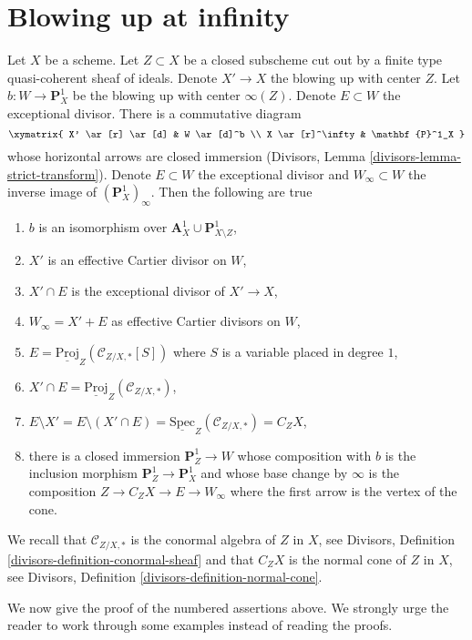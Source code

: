 \section{Blowing up at infinity}
\label{section-blowup-Z-first}

\noindent
Let $X$ be a scheme. Let $Z \subset X$ be a closed subscheme cut out
by a finite type quasi-coherent sheaf of ideals. Denote $X' \to X$
the blowing up with center $Z$. Let $b : W \to \mathbf{P}^1_X$ be the
blowing up with center $\infty(Z)$. Denote $E \subset W$ the exceptional
divisor. There is a commutative diagram
$$
\xymatrix{
X' \ar[r] \ar[d] & W \ar[d]^b \\
X \ar[r]^\infty & \mathbf{P}^1_X
}
$$
whose horizontal arrows are closed immersion
(Divisors, Lemma \ref{divisors-lemma-strict-transform}). Denote $E \subset W$
the exceptional divisor and $W_\infty \subset W$ the inverse image
of $(\mathbf{P}^1_X)_\infty$. Then the following are true
\begin{enumerate}
\item $b$ is an isomorphism over
$\mathbf{A}^1_X \cup \mathbf{P}^1_{X \setminus Z}$,
\item $X'$ is an effective Cartier divisor on $W$,
\item $X' \cap E$ is the exceptional divisor of $X' \to X$,
\item $W_\infty = X' + E$ as effective Cartier divisors on $W$,
\item $E = \underline{\text{Proj}}_Z(\mathcal{C}_{Z/X, *}[S])$ where $S$
is a variable placed in degree $1$,
\item $X' \cap E = \underline{\text{Proj}}_Z(\mathcal{C}_{Z/X, *})$,
\item
\label{item-cone-is-open}
$E \setminus X' = E \setminus (X' \cap E) =
\underline{\text{Spec}}_Z(\mathcal{C}_{Z/X, *}) = C_ZX$,
\item
\label{item-find-Z-in-blowup}
there is a closed immersion $\mathbf{P}^1_Z \to W$ whose
composition with $b$ is the inclusion morphism
$\mathbf{P}^1_Z \to \mathbf{P}^1_X$ and whose base change by $\infty$
is the composition $Z \to C_ZX \to E \to W_\infty$ where the first
arrow is the vertex of the cone.
\end{enumerate}
We recall that $\mathcal{C}_{Z/X, *}$ is the conormal algebra of $Z$ in $X$,
see Divisors, Definition \ref{divisors-definition-conormal-sheaf} and
that $C_ZX$ is the normal cone of $Z$ in $X$, see
Divisors, Definition \ref{divisors-definition-normal-cone}.

\medskip\noindent
We now give the proof of the numbered assertions above. We strongly
urge the reader to work through some examples instead of reading the
proofs.

